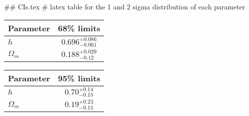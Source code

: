## CIs.tex
# latex table for the 1 and 2 sigma distribution of each parameter

\begin{tabular} { l  c}
 Parameter &  68\% limits\\
\hline
{\boldmath$h              $} & $0.696^{+0.086}_{-0.061}   $\\
{\boldmath$\Omega_m       $} & $0.188^{+0.029}_{-0.12}    $\\
\hline
\end{tabular}

\begin{tabular} { l  c}
 Parameter &  95\% limits\\
\hline
{\boldmath$h              $} & $0.70^{+0.14}_{-0.15}      $\\
{\boldmath$\Omega_m       $} & $0.19^{+0.23}_{-0.15}      $\\
\hline
\end{tabular}

